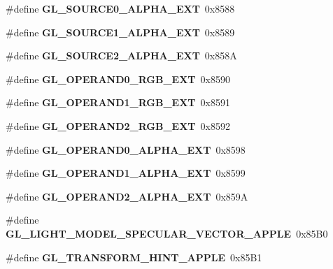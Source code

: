 \begin{DoxyCompactItemize}
\item 
\#define {\bfseries G\+L\+\_\+\+S\+O\+U\+R\+C\+E0\+\_\+\+A\+L\+P\+H\+A\+\_\+\+E\+X\+T}~0x8588\label{_s_d_l__opengl_8h_a641340cd5bdf7ef928abe4f61573fb5f}

\item 
\#define {\bfseries G\+L\+\_\+\+S\+O\+U\+R\+C\+E1\+\_\+\+A\+L\+P\+H\+A\+\_\+\+E\+X\+T}~0x8589\label{_s_d_l__opengl_8h_a0530a1e623d0eca15ebc550a15655de4}

\item 
\#define {\bfseries G\+L\+\_\+\+S\+O\+U\+R\+C\+E2\+\_\+\+A\+L\+P\+H\+A\+\_\+\+E\+X\+T}~0x858\+A\label{_s_d_l__opengl_8h_ab9cc98399f92da05d5cb2f5b1296d18e}

\item 
\#define {\bfseries G\+L\+\_\+\+O\+P\+E\+R\+A\+N\+D0\+\_\+\+R\+G\+B\+\_\+\+E\+X\+T}~0x8590\label{_s_d_l__opengl_8h_ae1340b36e53e8944966733f91821482c}

\item 
\#define {\bfseries G\+L\+\_\+\+O\+P\+E\+R\+A\+N\+D1\+\_\+\+R\+G\+B\+\_\+\+E\+X\+T}~0x8591\label{_s_d_l__opengl_8h_a4536bac66ad5f01113d5c844a03b9e11}

\item 
\#define {\bfseries G\+L\+\_\+\+O\+P\+E\+R\+A\+N\+D2\+\_\+\+R\+G\+B\+\_\+\+E\+X\+T}~0x8592\label{_s_d_l__opengl_8h_ac46e7ba74ead005d719e703f326ac0e0}

\item 
\#define {\bfseries G\+L\+\_\+\+O\+P\+E\+R\+A\+N\+D0\+\_\+\+A\+L\+P\+H\+A\+\_\+\+E\+X\+T}~0x8598\label{_s_d_l__opengl_8h_ae40184d42da6833f833b26c3e764264d}

\item 
\#define {\bfseries G\+L\+\_\+\+O\+P\+E\+R\+A\+N\+D1\+\_\+\+A\+L\+P\+H\+A\+\_\+\+E\+X\+T}~0x8599\label{_s_d_l__opengl_8h_ab0928f78d8cf1fe5513aaefdb9ae274f}

\item 
\#define {\bfseries G\+L\+\_\+\+O\+P\+E\+R\+A\+N\+D2\+\_\+\+A\+L\+P\+H\+A\+\_\+\+E\+X\+T}~0x859\+A\label{_s_d_l__opengl_8h_a3cfa377dc5d7259842117197b2bc8a74}

\item 
\#define {\bfseries G\+L\+\_\+\+L\+I\+G\+H\+T\+\_\+\+M\+O\+D\+E\+L\+\_\+\+S\+P\+E\+C\+U\+L\+A\+R\+\_\+\+V\+E\+C\+T\+O\+R\+\_\+\+A\+P\+P\+L\+E}~0x85\+B0\label{_s_d_l__opengl_8h_ac916790f08a1a79f366c018ce0b9012b}

\item 
\#define {\bfseries G\+L\+\_\+\+T\+R\+A\+N\+S\+F\+O\+R\+M\+\_\+\+H\+I\+N\+T\+\_\+\+A\+P\+P\+L\+E}~0x85\+B1\label{_s_d_l__opengl_8h_ae5983a1005e3fd7b8b845b1b222e1b5c}


\end{DoxyCompactItemize}
